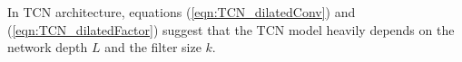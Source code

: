 

In TCN architecture, equations (\ref{eqn:TCN_dilatedConv}) and (\ref{eqn:TCN_dilatedFactor}) suggest that the TCN model heavily depends on the network depth $L$ and the filter size $k$.
